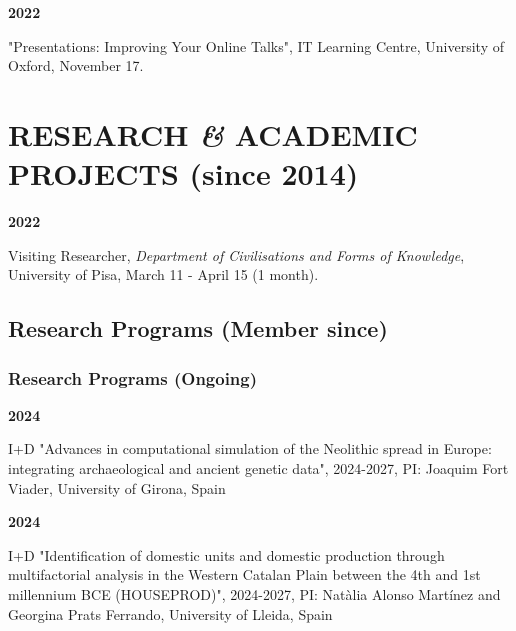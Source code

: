 \documentclass{article}
\newcommand{\fr}[1]{} %
\newcommand{\en}[1]{#1}   %
\begin{document}
\textbf{2022 }
\fr{"Presentations: Improving your online talks", IT Learning Centre, University of Oxford, 17 Novembre.}
\en{"Presentations: Improving Your Online Talks", IT Learning Centre, University of Oxford, November 17.}
\smallbreak


\section{\fr{PROJETS DE RECHERCHE \textit{\&} ACADÉMIQUES (depuis 2014)}\en{RESEARCH \textit{\&} ACADEMIC PROJECTS (since 2014)}}

\textbf{2022}
\fr{Chercheur invité, \textit{Dipartimento di Civiltà e forme del Sapere}, Università di Pisa, 11 mars - 15 avril (1 mois).}
\en{Visiting Researcher, \textit{Department of Civilisations and Forms of Knowledge}, University of Pisa, March 11 - April 15 (1 month).}

\smallbreak

\subsection*{\fr{Programmes de recherche (Membre depuis)}\en{Research Programs (Member since)}}
\subsubsection*{\fr{En cours}\en{Research Programs (Ongoing)}}

\textbf{2024 }
\fr{I+D "Advances in computational simulation of the Neolithic spread in Europe: integrating archaeological and ancient genetic data", 2024-2027, PI: Joaquim Fort Viader, Universitat de Girona, Espagne}
\en{I+D "Advances in computational simulation of the Neolithic spread in Europe: integrating archaeological and ancient genetic data", 2024-2027, PI: Joaquim Fort Viader, University of Girona, Spain}

\textbf{2024 }
\fr{I+D "Identification of domestic units and domestic production through multifactorial analysis in the Western Catalan Plain between the 4th and 1st millennium BCE (HOUSEPROD)", 2024-2027, PI: Natàlia Alonso Martínez et Georgina Prats Ferrando, Universitat de Lleida, Spain}
\en{I+D "Identification of domestic units and domestic production through multifactorial analysis in the Western Catalan Plain between the 4th and 1st millennium BCE (HOUSEPROD)", 2024-2027, PI: Natàlia Alonso Martínez and Georgina Prats Ferrando, University of Lleida, Spain}
\end{document}
